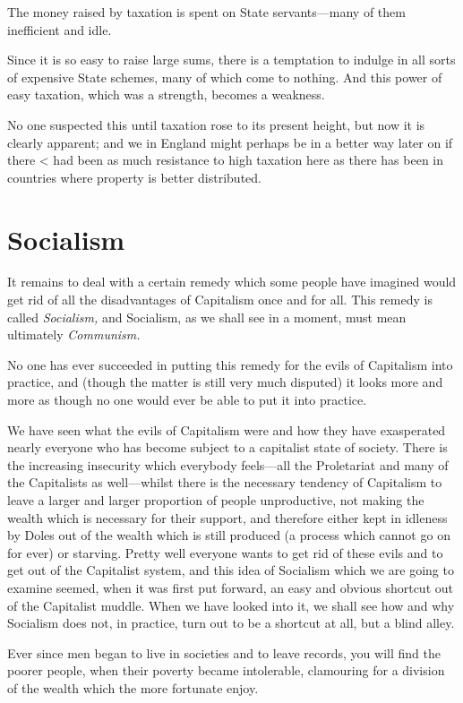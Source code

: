 \documentclass{book}
\begin{document}
The money raised by taxation is spent on State servants—many of them inefficient and idle.

Since it is so easy to raise large sums, there is a temptation to indulge in all sorts of expensive State schemes, many of which come to nothing. And this power of easy taxation, which was a strength, becomes a weakness.

No one suspected this until taxation rose to its present height, but now it is clearly apparent; and we in England might perhaps be in a better way later on if there < had been as much resistance to high taxation here as there has been in countries where property is better distributed.

\chapter*{Socialism}
\label{chapter-14}
It remains to deal with a certain remedy which some people have imagined would get rid of all the disadvantages of Capitalism once and for all. This remedy is called \emph{Socialism,} and Socialism, as we shall see in a moment, must mean ultimately \emph{Communism.}

No one has ever succeeded in putting this remedy for the evils of Capitalism into practice, and (though the matter is still very much disputed) it looks more and more as though no one would ever be able to put it into practice.

We have seen what the evils of Capitalism were and how they have exasperated nearly everyone who has become subject to a capitalist state of society. There is the increasing insecurity which everybody feels—all the Proletariat and many of the Capitalists as well—whilst there is the necessary tendency of Capitalism to leave a larger and larger proportion of people unproductive, not making the wealth which is necessary for their support, and therefore either kept in idleness by Doles out of the wealth which is still produced (a process which cannot go on for ever) or starving. Pretty well everyone wants to get rid of these evils and to get out of the Capitalist system, and this idea of Socialism which we are going to examine seemed, when it was first put forward, an easy and obvious shortcut out of the Capitalist muddle. When we have looked into it, we shall see how and why Socialism does not, in practice, turn out to be a shortcut at all, but a blind alley.

Ever since men began to live in societies and to leave records, you will find the poorer people, when their poverty became intolerable, clamouring for a division of the wealth which the more fortunate enjoy.
\end{document}
